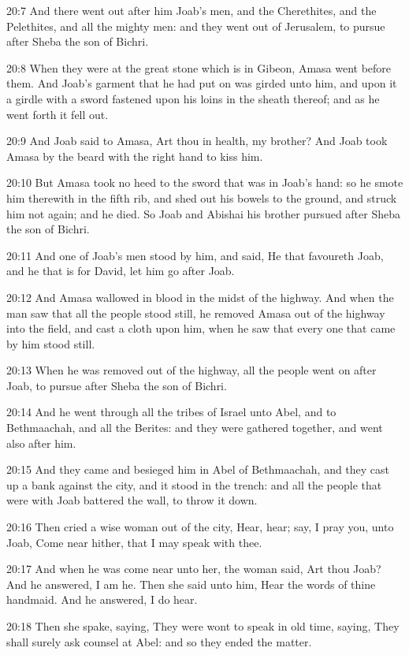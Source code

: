 20:7 And there went out after him Joab's men, and the Cherethites, and the Pelethites, and all the mighty men: and they went out of Jerusalem, to pursue after Sheba the son of Bichri.

20:8 When they were at the great stone which is in Gibeon, Amasa went before them. And Joab's garment that he had put on was girded unto him, and upon it a girdle with a sword fastened upon his loins in the sheath thereof; and as he went forth it fell out.

20:9 And Joab said to Amasa, Art thou in health, my brother? And Joab took Amasa by the beard with the right hand to kiss him.

20:10 But Amasa took no heed to the sword that was in Joab's hand: so he smote him therewith in the fifth rib, and shed out his bowels to the ground, and struck him not again; and he died. So Joab and Abishai his brother pursued after Sheba the son of Bichri.

20:11 And one of Joab's men stood by him, and said, He that favoureth Joab, and he that is for David, let him go after Joab.

20:12 And Amasa wallowed in blood in the midst of the highway. And when the man saw that all the people stood still, he removed Amasa out of the highway into the field, and cast a cloth upon him, when he saw that every one that came by him stood still.

20:13 When he was removed out of the highway, all the people went on after Joab, to pursue after Sheba the son of Bichri.

20:14 And he went through all the tribes of Israel unto Abel, and to Bethmaachah, and all the Berites: and they were gathered together, and went also after him.

20:15 And they came and besieged him in Abel of Bethmaachah, and they cast up a bank against the city, and it stood in the trench: and all the people that were with Joab battered the wall, to throw it down.

20:16 Then cried a wise woman out of the city, Hear, hear; say, I pray you, unto Joab, Come near hither, that I may speak with thee.

20:17 And when he was come near unto her, the woman said, Art thou Joab?  And he answered, I am he. Then she said unto him, Hear the words of thine handmaid. And he answered, I do hear.

20:18 Then she spake, saying, They were wont to speak in old time, saying, They shall surely ask counsel at Abel: and so they ended the matter.

